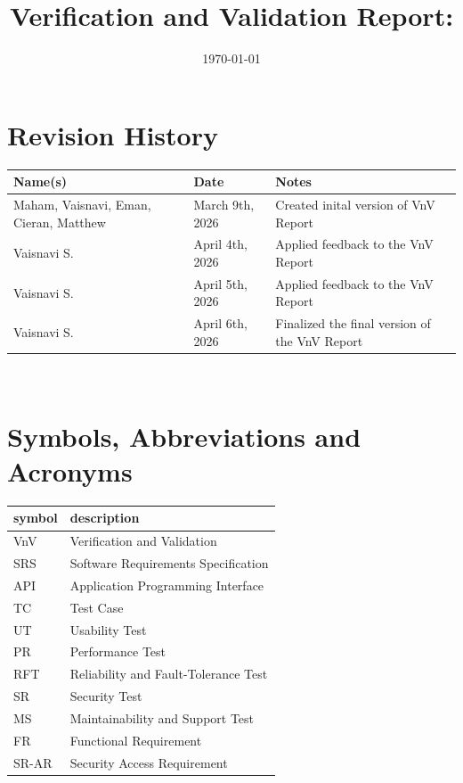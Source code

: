 \documentclass[12pt, titlepage]{article}
\begin{document}
\title{Verification and Validation Report: \progname} 
\author{\authname}
\date{\today}
	
\maketitle


\section{Revision History}

\begin{tabularx}{\textwidth}{p{5cm}p{2cm}X}
\toprule {\bf Name(s)} & {\bf Date} & {\bf Notes}\\
\midrule
Maham, Vaisnavi, Eman, Cieran, Matthew & March 9th, 2026 & Created inital version of VnV Report\\
Vaisnavi S. & April 4th, 2026 & Applied feedback to the VnV Report\\
Vaisnavi S. & April 5th, 2026 & Applied feedback to the VnV Report\\
Vaisnavi S. & April 6th, 2026 & Finalized the final version of the VnV Report\\
\bottomrule
\end{tabularx}

~\newpage


\newpage

\tableofcontents

\listoftables %

\listoffigures %

\section{Symbols, Abbreviations and Acronyms}

\renewcommand{\arraystretch}{1.2}
\begin{tabular}{l l} 
  \toprule		
  \textbf{symbol} & \textbf{description}\\
  \midrule 
  VnV & Verification and Validation\\
  SRS & Software Requirements Specification\\
  API & Application Programming Interface\\
  TC & Test Case\\
  UT & Usability Test\\
  PR & Performance Test\\
  RFT & Reliability and Fault-Tolerance Test\\
  SR & Security Test\\
  MS & Maintainability and Support Test\\
  FR & Functional Requirement\\
  SR-AR & Security Access Requirement\\
  \bottomrule
\end{tabular}\\
\end{document}
